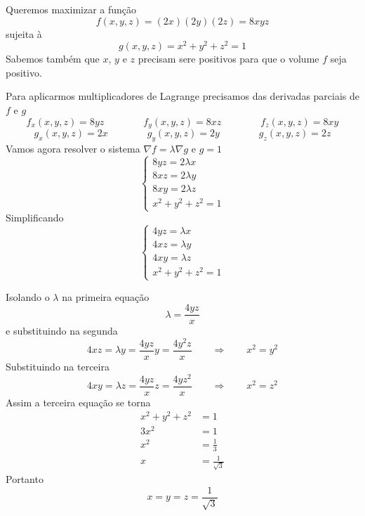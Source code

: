 \documentclass[a4paper,12pt,fleqn]{article}
\begin{document}
\begin{answer}
  Queremos maximizar a função
  \[
    f(x, y, z) = (2x)(2y)(2z) = 8xyz
  \]
  sujeita à
  \[
    g(x, y, z) = x^2 + y^2 + z^2 = 1
  \]
  Sabemos também que $x$, $y$ e $z$ precisam sere positivos para que o volume $f$
  seja positivo.

  Para aplicarmos multiplicadores de Lagrange precisamos das derivadas
  parciais de $f$ e $g$
  \[
    f_x(x, y, z) = 8yz \qquad\qquad
    f_y(x, y, z) = 8xz \qquad\qquad
    f_z(x, y, z) = 8xy
  \]
  \[
    g_x(x, y, z) = 2x \qquad\qquad
    g_y(x, y, z) = 2y \qquad\qquad
    g_z(x, y, z) = 2z
  \]
  Vamos agora resolver o sistema \(\nabla f = \lambda\nabla g\) e \(g=1\)
  \[
  \begin{cases}
    8yz = 2\lambda x \\
    8xz = 2\lambda y \\
    8xy = 2\lambda z \\
    x^2 + y^2 + z^2 = 1
  \end{cases}
  \]
  Simplificando
  \[
  \begin{cases}
    4yz = \lambda x \\
    4xz = \lambda y \\
    4xy = \lambda z \\
    x^2 + y^2 + z^2 = 1
  \end{cases}
  \]

  Isolando o $\lambda$ na primeira equação
  \[
    \lambda = \frac{4yz}{x}
  \]
  e substituindo na segunda
  \[
    4xz
    = \lambda y
    = \frac{4yz}{x} y
    = \frac{4y^2z}{x}
    \qquad\Rightarrow\qquad
    x^2 = y^2
  \]
  Substituindo na terceira
  \[
    4xy = \lambda z
    = \frac{4yz}{x}z
    = \frac{4yz^2}{x}
    \qquad\Rightarrow\qquad
    x^2 = z^2
  \]
  Assim a terceira equação se torna
  \begin{align*}
    x^2 + y^2 + z^2 & = 1                      \\[2mm]
    3x^2            & = 1                      \\[2mm]
    x^2             & = \frac{1}{3}            \\[2mm]
    x               & = \frac{1}{\sqrt{3}}
  \end{align*}
  Portanto
  \[
    x = y = z = \frac{1}{\sqrt{3}}
  \]
  \clearpage
\end{answer}

\end{document}
